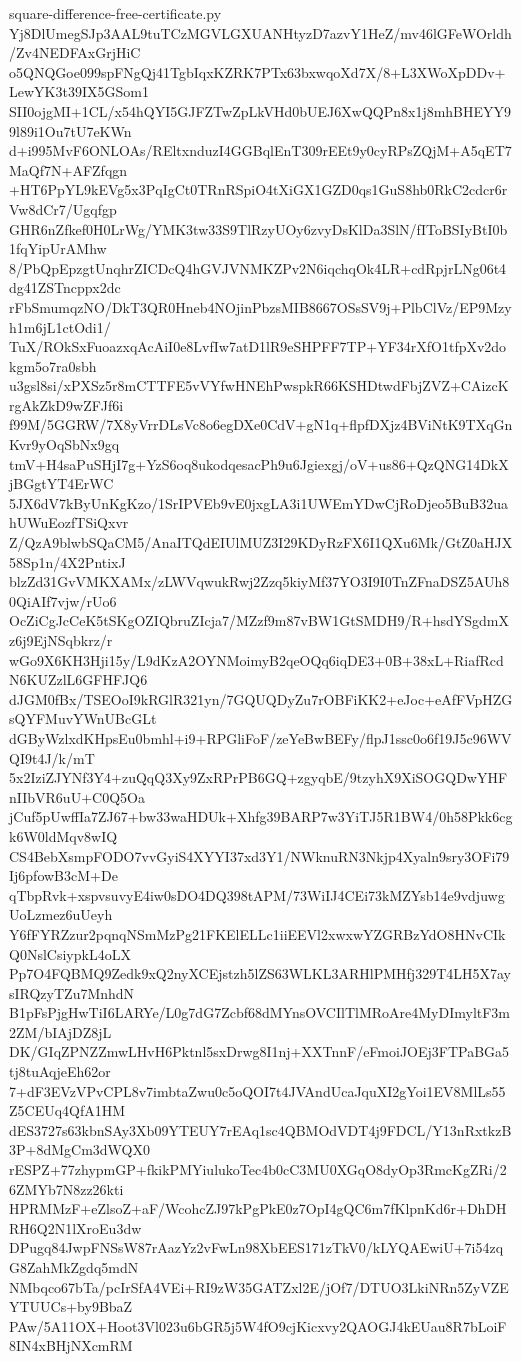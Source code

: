 \documentclass[11pt]{article}
\theoremstyle{definition}
\theoremstyle{remark}
\begin{document}
\begin{filecontents*}[overwrite]{square-difference-free-certificate.py}
Yj8DlUmegSJp3AAL9tuTCzMGVLGXUANHtyzD7azvY1HeZ/mv46lGFeWOrldh/Zv4NEDFAxGrjHiC
o5QNQGoe099spFNgQj41TgbIqxKZRK7PTx63bxwqoXd7X/8+L3XWoXpDDv+LewYK3t39IX5GSom1
SII0ojgMI+1CL/x54hQYI5GJFZTwZpLkVHd0bUEJ6XwQQPn8x1j8mhBHEYY99l89i1Ou7tU7eKWn
d+i995MvF6ONLOAs/REltxnduzI4GGBqlEnT309rEEt9y0cyRPsZQjM+A5qET7MaQf7N+AFZfqgn
+HT6PpYL9kEVg5x3PqIgCt0TRnRSpiO4tXiGX1GZD0qs1GuS8hb0RkC2cdcr6rVw8dCr7/Ugqfgp
GHR6nZfkef0H0LrWg/YMK3tw33S9TlRzyUOy6zvyDsKlDa3SlN/fIToBSIyBtI0b1fqYipUrAMhw
8/PbQpEpzgtUnqhrZICDcQ4hGVJVNMKZPv2N6iqchqOk4LR+cdRpjrLNg06t4dg41ZSTncppx2dc
rFbSmumqzNO/DkT3QR0Hneb4NOjinPbzsMIB8667OSsSV9j+PlbClVz/EP9Mzyh1m6jL1ctOdi1/
TuX/ROkSxFuoazxqAcAiI0e8LvfIw7atD1lR9eSHPFF7TP+YF34rXfO1tfpXv2dokgm5o7ra0sbh
u3gsl8si/xPXSz5r8mCTTFE5vVYfwHNEhPwspkR66KSHDtwdFbjZVZ+CAizcKrgAkZkD9wZFJf6i
f99M/5GGRW/7X8yVrrDLsVc8o6egDXe0CdV+gN1q+flpfDXjz4BViNtK9TXqGnKvr9yOqSbNx9gq
tmV+H4saPuSHjI7g+YzS6oq8ukodqesacPh9u6Jgiexgj/oV+us86+QzQNG14DkXjBGgtYT4ErWC
5JX6dV7kByUnKgKzo/1SrIPVEb9vE0jxgLA3i1UWEmYDwCjRoDjeo5BuB32uahUWuEozfTSiQxvr
Z/QzA9blwbSQaCM5/AnaITQdEIUlMUZ3I29KDyRzFX6I1QXu6Mk/GtZ0aHJX58Sp1n/4X2PntixJ
blzZd31GvVMKXAMx/zLWVqwukRwj2Zzq5kiyMf37YO3I9I0TnZFnaDSZ5AUh80QiAIf7vjw/rUo6
OcZiCgJcCeK5tSKgOZIQbruZIcja7/MZzf9m87vBW1GtSMDH9/R+hsdYSgdmXz6j9EjNSqbkrz/r
wGo9X6KH3Hji15y/L9dKzA2OYNMoimyB2qeOQq6iqDE3+0B+38xL+RiafRcdN6KUZzlL6GFHFJQ6
dJGM0fBx/TSEOoI9kRGlR321yn/7GQUQDyZu7rOBFiKK2+eJoc+eAfFVpHZGsQYFMuvYWnUBcGLt
dGByWzlxdKHpsEu0bmhl+i9+RPGliFoF/zeYeBwBEFy/flpJ1ssc0o6f19J5c96WVQI9t4J/k/mT
5x2IziZJYNf3Y4+zuQqQ3Xy9ZxRPrPB6GQ+zgyqbE/9tzyhX9XiSOGQDwYHFnIIbVR6uU+C0Q5Oa
jCuf5pUwffIa7ZJ67+bw33waHDUk+Xhfg39BARP7w3YiTJ5R1BW4/0h58Pkk6cgk6W0ldMqv8wIQ
CS4BebXsmpFODO7vvGyiS4XYYI37xd3Y1/NWknuRN3Nkjp4Xyaln9sry3OFi79Ij6pfowB3cM+De
qTbpRvk+xspvsuvyE4iw0sDO4DQ398tAPM/73WiIJ4CEi73kMZYsb14e9vdjuwgUoLzmez6uUeyh
Y6fFYRZzur2pqnqNSmMzPg21FKElELLc1iiEEVl2xwxwYZGRBzYdO8HNvCIkQ0NslCsiypkL4oLX
Pp7O4FQBMQ9Zedk9xQ2nyXCEjstzh5lZS63WLKL3ARHlPMHfj329T4LH5X7aysIRQzyTZu7MnhdN
B1pFsPjgHwTiI6LARYe/L0g7dG7Zcbf68dMYnsOVCIlTlMRoAre4MyDImyltF3m2ZM/bIAjDZ8jL
DK/GIqZPNZZmwLHvH6Pktnl5sxDrwg8I1nj+XXTnnF/eFmoiJOEj3FTPaBGa5tj8tuAqjeEh62or
7+dF3EVzVPvCPL8v7imbtaZwu0c5oQOI7t4JVAndUcaJquXI2gYoi1EV8MlLs55Z5CEUq4QfA1HM
dES3727s63kbnSAy3Xb09YTEUY7rEAq1sc4QBMOdVDT4j9FDCL/Y13nRxtkzB3P+8dMgCm3dWQX0
rESPZ+77zhypmGP+fkikPMYiulukoTec4b0cC3MU0XGqO8dyOp3RmcKgZRi/26ZMYb7N8zz26kti
HPRMMzF+eZlsoZ+aF/WcohcZJ97kPgPkE0z7OpI4gQC6m7fKlpnKd6r+DhDHRH6Q2N1lXroEu3dw
DPugq84JwpFNSsW87rAazYz2vFwLn98XbEES171zTkV0/kLYQAEwiU+7i54zqG8ZahMkZgdq5mdN
NMbqco67bTa/pcIrSfA4VEi+RI9zW35GATZxl2E/jOf7/DTUO3LkiNRn5ZyVZEYTUUCs+by9BbaZ
PAw/5A11OX+Hoot3Vl023u6bGR5j5W4fO9cjKicxvy2QAOGJ4kEUau8R7bLoiF8IN4xBHjNXcmRM

\end{filecontents*}
\end{document}
